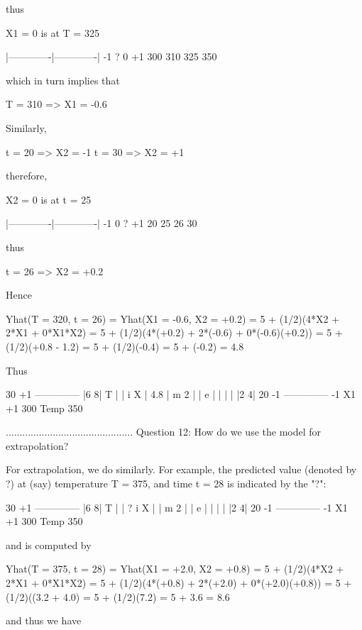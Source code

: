 thus

   X1 = 0 is at T = 325


        |-------------|-------------|
       -1     ?       0            +1
       300   310     325           350

which in turn implies that

   T = 310 => X1 = -0.6

Similarly,

   t = 20 => X2 = -1
   t = 30 => X2 = +1

therefore,

   X2 = 0 is at t = 25

        |-------------|-------------|
       -1             0   ?        +1
       20             25 26        30

thus

   t = 26 => X2 = +0.2

Hence

     Yhat(T = 320, t = 26)
   = Yhat(X1 = -0.6, X2 = +0.2)
   = 5 + (1/2)(4*X2 + 2*X1 + 0*X1*X2)
   = 5 + (1/2)(4*(+0.2) + 2*(-0.6) + 0*(-0.6)(+0.2))
   = 5 + (1/2)(+0.8 - 1.2)
   = 5 + (1/2)(-0.4)
   = 5 + (-0.2)
   = 4.8

Thus

    30 +1 --------------
          |6          8|
     T    |            |
     i  X | 4.8        |
     m  2 |            |
     e    |            |
          |            |
          |2          4|
    20 -1 --------------
          -1    X1    +1
          300  Temp  350

..............................................
Question 12: How do we use the model for extrapolation?

For extrapolation, we do similarly.  For example,
the predicted value (denoted by ?) at (say) temperature T = 375,
and time t = 28 is indicated by the "?":

    30 +1 --------------
          |6          8|
     T    |            |     ?
     i  X |            |
     m  2 |            |
     e    |            |
          |            |
          |2          4|
    20 -1 --------------
          -1    X1    +1
          300  Temp  350

and is computed by

     Yhat(T = 375, t = 28)
   = Yhat(X1 = +2.0, X2 = +0.8)
   = 5 + (1/2)(4*X2 + 2*X1 + 0*X1*X2)
   = 5 + (1/2)(4*(+0.8) + 2*(+2.0) + 0*(+2.0)(+0.8))
   = 5 + (1/2)((3.2 + 4.0)
   = 5 + (1/2)(7.2)
   = 5 + 3.6
   = 8.6

and thus we have

